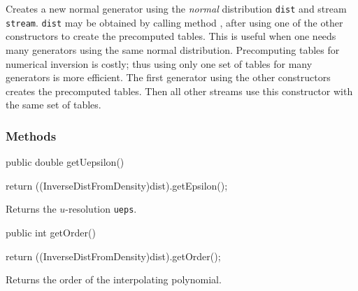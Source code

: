  \begin{tabb}  Creates a new normal generator using the \emph{normal}
   distribution \texttt{dist} and stream \texttt{stream}. \texttt{dist}
   may be obtained by calling method ,
   after using one of the other constructors to create the 
   precomputed tables. This is useful when one needs many   generators
 using the same normal distribution.
 Precomputing tables for numerical inversion is
 costly; thus using only one set of tables for many generators 
is more efficient. The first  generator 
 using the other constructors creates the precomputed tables.
Then all other streams use this constructor with the same set of tables.
\end{tabb}


\subsubsection* {Methods}
\begin{code}

   public double getUepsilon()\begin{hide} {
      return ((InverseDistFromDensity)dist).getEpsilon();
   }
\end{hide}
\end{code}
\begin{tabb}
   Returns the $u$-resolution \texttt{ueps}.
\end{tabb}
\begin{code}

   public int getOrder()\begin{hide} {
      return ((InverseDistFromDensity)dist).getOrder();
   }
\end{hide}
\end{code}
\begin{tabb}
   Returns the order of the interpolating polynomial.
\end{tabb}

\begin{hide}
\begin{code}
}\end{code}
\end{hide}
